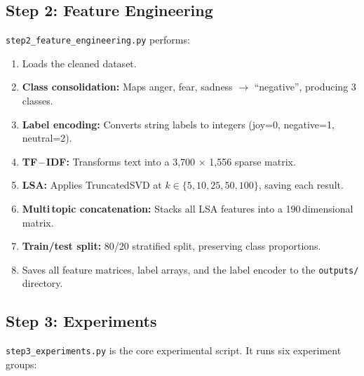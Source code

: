 \documentclass[12pt,a4paper,twoside]{article}
\theoremstyle{definition}
\begin{document}
\subsection{Step 2: Feature Engineering}

\texttt{step2\_feature\_engineering.py} performs:

\begin{enumerate}[leftmargin=2em]
    \item Loads the cleaned dataset.
    \item \textbf{Class consolidation:} Maps anger, fear, sadness $\to$ ``negative'', producing 3 classes.
    \item \textbf{Label encoding:} Converts string labels to integers (joy=0, negative=1, neutral=2).
    \item \textbf{TF\,--\,IDF:} Transforms text into a 3{,}700 $\times$ 1{,}556 sparse matrix.
    \item \textbf{LSA:} Applies TruncatedSVD at $k \in \{5, 10, 25, 50, 100\}$, saving each result.
    \item \textbf{Multi\,topic concatenation:} Stacks all LSA features into a 190\,dimensional matrix.
    \item \textbf{Train/test split:} 80/20 stratified split, preserving class proportions.
    \item Saves all feature matrices, label arrays, and the label encoder to the \texttt{outputs/} directory.
\end{enumerate}

\subsection{Step 3: Experiments}

\texttt{step3\_experiments.py} is the core experimental script. It runs six experiment groups:
\end{document}
